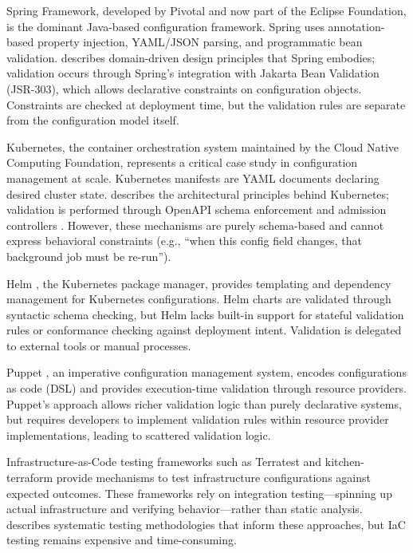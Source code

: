 Spring Framework, developed by Pivotal and now part of the Eclipse Foundation, is the dominant Java-based configuration framework. Spring uses annotation-based property injection, YAML/JSON parsing, and programmatic bean validation. \citet{Evans2003} describes domain-driven design principles that Spring embodies; validation occurs through Spring's integration with Jakarta Bean Validation (JSR-303), which allows declarative constraints on configuration objects. Constraints are checked at deployment time, but the validation rules are separate from the configuration model itself.

Kubernetes, the container orchestration system maintained by the Cloud Native Computing Foundation, represents a critical case study in configuration management at scale. Kubernetes manifests are YAML documents declaring desired cluster state. \citet{Burns2016} describes the architectural principles behind Kubernetes; validation is performed through OpenAPI schema enforcement and admission controllers \citep{Kubernetes2023}. However, these mechanisms are purely schema-based and cannot express behavioral constraints (e.g., ``when this config field changes, that background job must be re-run'').

Helm \citep{Helm2023}, the Kubernetes package manager, provides templating and dependency management for Kubernetes configurations. Helm charts are validated through syntactic schema checking, but Helm lacks built-in support for stateful validation rules or conformance checking against deployment intent. Validation is delegated to external tools or manual processes.

Puppet \citep{Puppet2023}, an imperative configuration management system, encodes configurations as code (DSL) and provides execution-time validation through resource providers. Puppet's approach allows richer validation logic than purely declarative systems, but requires developers to implement validation rules within resource provider implementations, leading to scattered validation logic.

Infrastructure-as-Code testing frameworks such as Terratest \citep{Gruntwerk2020} and kitchen-terraform provide mechanisms to test infrastructure configurations against expected outcomes. These frameworks rely on integration testing—spinning up actual infrastructure and verifying behavior—rather than static analysis. \citet{Zeller1999} describes systematic testing methodologies that inform these approaches, but IaC testing remains expensive and time-consuming.


